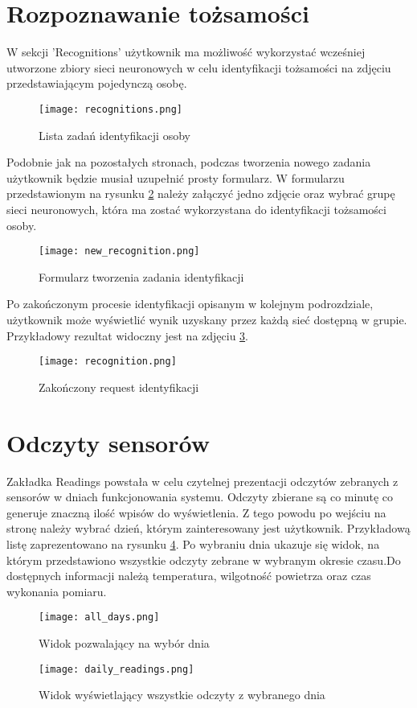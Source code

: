 \section{Rozpoznawanie tożsamości}
W sekcji 'Recognitions' użytkownik ma możliwość wykorzystać wcześniej utworzone zbiory sieci neuronowych w celu identyfikacji tożsamości na zdjęciu przedstawiającym pojedynczą osobę.
\begin{figure}[H]
	\centering
	\texttt{[image: recognitions.png]}
	\caption{Lista zadań identyfikacji osoby}
	\label{fig:recognitions}
\end{figure}
Podobnie jak na pozostałych stronach, podczas tworzenia nowego zadania użytkownik będzie musiał uzupełnić prosty formularz. W formularzu przedstawionym na rysunku \ref{fig:new_recognition} należy załączyć jedno zdjęcie oraz wybrać grupę sieci neuronowych, która ma zostać wykorzystana do identyfikacji tożsamości osoby.
\begin{figure}[H]
	\centering
	\texttt{[image: new\_recognition.png]}
	\caption{Formularz tworzenia zadania identyfikacji}
	\label{fig:new_recognition}
\end{figure}
Po zakończonym procesie identyfikacji opisanym w kolejnym podrozdziale, użytkownik może wyświetlić wynik uzyskany przez każdą sieć dostępną w grupie. Przykładowy rezultat widoczny jest na zdjęciu \ref{fig:recognition}.
\begin{figure}[H]
	\centering
	\texttt{[image: recognition.png]}
	\caption{Zakończony request identyfikacji}
	\label{fig:recognition}
\end{figure}

\section{Odczyty sensorów}
Zakładka Readings powstała w celu czytelnej prezentacji odczytów zebranych z sensorów w dniach funkcjonowania systemu. Odczyty zbierane są co minutę co generuje znaczną ilość wpisów do wyświetlenia. Z tego powodu po wejściu na stronę należy wybrać dzień, którym zainteresowany jest użytkownik. Przykładową listę zaprezentowano na rysunku \ref{fig:all_days}. Po wybraniu dnia ukazuje się widok, na którym przedstawiono wszystkie odczyty zebrane w wybranym okresie czasu.Do dostępnych informacji należą temperatura, wilgotność powietrza oraz czas wykonania pomiaru.
\begin{figure}[H]
	\centering
	\texttt{[image: all\_days.png]}
	\caption{Widok pozwalający na wybór dnia}
	\label{fig:all_days}
\end{figure}
\begin{figure}[H]
	\centering
	\texttt{[image: daily\_readings.png]}
	\caption{Widok wyświetlający wszystkie odczyty z wybranego dnia}
	\label{fig:daily_readings}
\end{figure}

